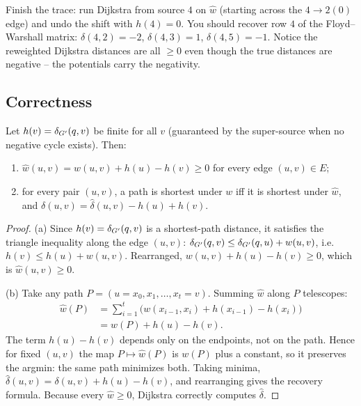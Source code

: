 \begin{labbox}
Finish the trace: run Dijkstra from source $4$ on $\hat w$ (starting across the $4\to2(0)$ edge) and undo
the shift with $h(4)=0$. You should recover row $4$ of the Floyd--Warshall matrix:
$\delta(4,2)=-2$, $\delta(4,3)=1$, $\delta(4,5)=-1$. Notice the reweighted Dijkstra distances are all
$\ge 0$ even though the true distances are negative -- the potentials carry the negativity.
\end{labbox}

\subsection{Correctness}

\begin{theorem}
\label{ch09:thm-johnson}
Let $h(v)=\delta_{G'}(q,v)$ be finite for all $v$ (guaranteed by the super-source when no negative
cycle exists). Then:
\begin{enumerate}
  \item[(a)] $\hat{w}(u,v)=w(u,v)+h(u)-h(v)\ge 0$ for every edge $(u,v)\in E$;
  \item[(b)] for every pair $(u,v)$, a path is shortest under $w$ iff it is shortest under $\hat w$, and
        $\delta(u,v)=\hat\delta(u,v)-h(u)+h(v)$.
\end{enumerate}
\end{theorem}

\begin{proof}
(a) Since $h(v)=\delta_{G'}(q,v)$ is a shortest-path distance, it satisfies the triangle inequality
along the edge $(u,v)$: $\delta_{G'}(q,v)\le\delta_{G'}(q,u)+w(u,v)$, i.e. $h(v)\le h(u)+w(u,v)$.
Rearranged, $w(u,v)+h(u)-h(v)\ge 0$, which is $\hat w(u,v)\ge 0$.

(b) Take any path $P=(u=x_0,x_1,\dots,x_t=v)$. Summing $\hat w$ along $P$ telescopes:
\begin{align*}
  \hat w(P) &= \sum_{i=1}^{t}\big(w(x_{i-1},x_i)+h(x_{i-1})-h(x_i)\big) \\
  &= w(P)+h(u)-h(v).
\end{align*}
The term $h(u)-h(v)$ depends only on the endpoints, not on the path. Hence for fixed $(u,v)$ the map
$P\mapsto\hat w(P)$ is $w(P)$ plus a constant, so it preserves the argmin: the same path minimizes both.
Taking minima, $\hat\delta(u,v)=\delta(u,v)+h(u)-h(v)$, and rearranging gives the recovery formula.
Because every $\hat w\ge 0$, Dijkstra correctly computes $\hat\delta$.
\end{proof}

